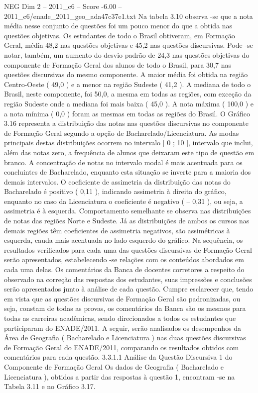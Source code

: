 \begin{textsample}{NEG Dim 2 – 2011\_c6 – Score -6.00 – 2011\_c6/enade\_2011\_geo\_ada47c37e1.txt}
Na tabela 3.10 observa -se que a nota média nesse conjunto de questões foi um pouco menor do que a obtida nas questões objetivas.
Os estudantes de todo o Brasil obtiveram, em Formação Geral, média 48,2 nas questões objetivas e 45,2 nas questões discursivas.
Pode -se notar, também, um aumento do desvio padrão de 24,3 nas questões objetivas do componente de Formação Geral dos alunos de todo o Brasil, para 30,7 nas questões discursivas do mesmo componente.
A maior média foi obtida na região Centro-Oeste ( 49,0 ) e a menor na região Sudeste ( 41,2 ).
A mediana de todo o Brasil, neste componente, foi 50,0, a mesma em todas as regiões, com exceção da região Sudeste onde a mediana foi mais baixa ( 45,0 ).
A nota máxima ( 100,0 ) e a nota mínima ( 0,0 ) foram as mesmas em todas as regiões do Brasil.
O Gráfico 3.16 representa a distribuição das notas nas questões discursivas no componente de Formação Geral segundo a opção de Bacharelado/Licenciatura.
As modas principais destas distribuições ocorrem no intervalo [ 0 ; 10 ], intervalo que inclui, além das notas zero, a frequência de alunos que deixaram este tipo de questão em branco.
A concentração de notas no intervalo modal é mais acentuada para os concluintes de Bacharelado, enquanto esta situação se inverte para a maioria dos demais intervalos.
O coeficiente de assimetria da distribuição das notas do Bacharelado é positivo ( 0,11 ), indicando assimetria à direita do gráfico, enquanto no caso da Licenciatura o coeficiente é negativo ( – 0,31 ), ou seja, a assimetria é à esquerda.
Comportamento semelhante se observa nas distribuições de notas das regiões Norte e Sudeste.
Já as distribuições de ambos os cursos nas demais regiões têm coeficientes de assimetria negativos, são assimétricas à esquerda, cauda mais acentuada no lado esquerdo do gráfico.
Na sequência, os resultados verificados para cada uma das questões discursivas de Formação Geral serão apresentados, estabelecendo -se relações com os conteúdos abordados em cada uma delas.
Os comentários da Banca de docentes corretores a respeito do observado na correção das respostas dos estudantes, suas impressões e conclusões serão apresentados junto à análise de cada questão.
Cumpre esclarecer que, tendo em vista que as questões discursivas de Formação Geral são padronizadas, ou seja, constam de todas as provas, os comentários da Banca são os mesmos para todas as carreiras acadêmicas, sendo direcionados a todos os estudantes que participaram do ENADE/2011.
A seguir, serão analisados os desempenhos da Área de Geografia ( Bacharelado e Licenciatura ) nas duas questões discursivas de Formação Geral do ENADE/2011, comparando os resultados obtidos com comentários para cada questão. 3.3.1.1 Análise da Questão Discursiva 1 do Componente de Formação Geral Os dados de Geografia ( Bacharelado e Licenciatura ), obtidos a partir das respostas à questão 1, encontram -se na Tabela 3.11 e no Gráfico 3.17.

\end{textsample}
